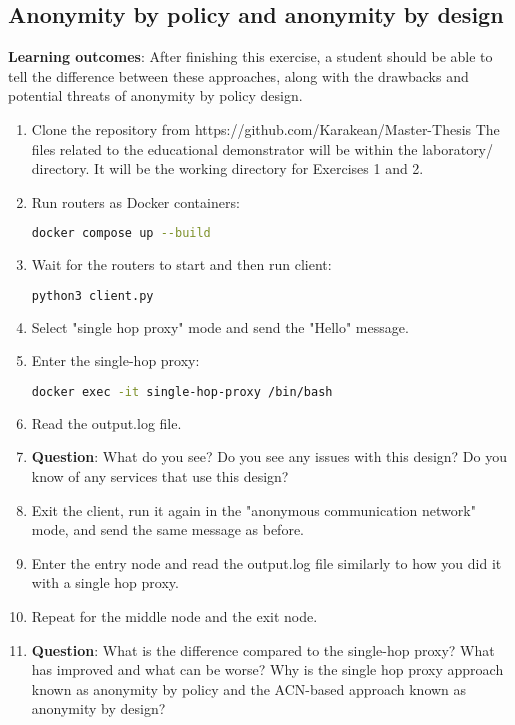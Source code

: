 \subsection{Anonymity by policy and anonymity by design}
\textbf{Learning outcomes}: After finishing this exercise, a student should be able to tell the difference between these approaches, along with the drawbacks and potential threats of anonymity by policy design.
\begin{enumerate}
    \item Clone the repository from https://github.com/Karakean/Master-Thesis
    The files related to the educational demonstrator will be within the laboratory/ directory. It will be the working directory for Exercises 1 and 2.
    \item Run routers as Docker containers:
    \begin{lstlisting}[language=bash]
    docker compose up --build
    \end{lstlisting}
    \item Wait for the routers to start and then run client:
    \begin{lstlisting}[language=bash]
    python3 client.py
    \end{lstlisting}
    \item Select "single hop proxy" mode and send the "Hello" message.
    \item Enter the single-hop proxy:
    \begin{lstlisting}[language=bash]
    docker exec -it single-hop-proxy /bin/bash
    \end{lstlisting}
    \item Read the output.log file.
    \item \textbf{Question}: What do you see? Do you see any issues with this design? Do you know of any services that use this design?
    \item Exit the client, run it again in the "anonymous communication network" mode, and send the same message as before.
    \item Enter the entry node and read the output.log file similarly to how you did it with a single hop proxy.
    \item Repeat for the middle node and the exit node.
    \item \textbf{Question}: What is the difference compared to the single-hop proxy? What has improved and what can be worse? Why is the single hop proxy approach known as anonymity by policy and the ACN-based approach known as anonymity by design?
\end{enumerate}

